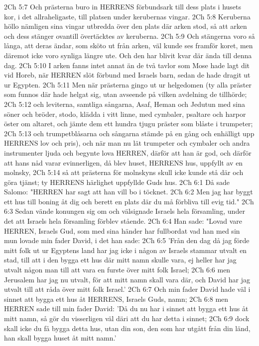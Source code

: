 2Ch 5:7  Och prästerna buro in HERRENS förbundsark till dess plats i husets kor, i det allraheligaste, till platsen under kerubernas vingar.
2Ch 5:8  Keruberna höllo nämligen sina vingar utbredda över den plats där arken stod, så att arken och dess stänger ovantill övertäcktes av keruberna.
2Ch 5:9  Och stängerna voro så långa, att deras ändar, som sköto ut från arken, väl kunde ses framför koret, men däremot icke voro synliga längre ute. Och den har blivit kvar där ända till denna dag.
2Ch 5:10  I arken fanns intet annat än de två tavlor som Mose hade lagt dit vid Horeb, när HERREN slöt förbund med Israels barn, sedan de hade dragit ut ur Egypten.
2Ch 5:11  Men när prästerna gingo ut ur helgedomen (ty alla präster som funnos där hade helgat sig, utan avseende på vilken avdelning de tillhörde;
2Ch 5:12  och leviterna, samtliga sångarna, Asaf, Heman och Jedutun med sina söner och bröder, stodo, klädda i vitt linne, med cymbaler, psaltare och harpor öster om altaret, och jämte dem ett hundra tjugu präster som blåste i trumpeter;
2Ch 5:13  och trumpetblåsarna och sångarna stämde på en gång och enhälligt upp HERRENS lov och pris), och när man nu lät trumpeter och cymbaler och andra instrumenter ljuda och begynte lova HERREN, därför att han är god, och därför att hans nåd varar evinnerligen, då blev huset, HERRENS hus, uppfyllt av en molnsky,
2Ch 5:14  så att prästerna för molnskyns skull icke kunde stå där och göra tjänst; ty HERRENS härlighet uppfyllde Guds hus.
2Ch 6:1  Då sade Salomo: "HERREN har sagt att han vill bo i töcknet.
2Ch 6:2  Men jag har byggt ett hus till boning åt dig och berett en plats där du må förbliva till evig tid."
2Ch 6:3  Sedan vände konungen sig om och välsignade Israels hela församling, under det att Israels hela församling förblev stående.
2Ch 6:4  Han sade: "Lovad vare HERREN, Israels Gud, som med sina händer har fullbordat vad han med sin mun lovade min fader David, i det han sade:
2Ch 6:5  'Från den dag då jag förde mitt folk ut ur Egyptens land har jag icke i någon av Israels stammar utvalt en stad, till att i den bygga ett hus där mitt namn skulle vara, ej heller har jag utvalt någon man till att vara en furste över mitt folk Israel;
2Ch 6:6  men Jerusalem har jag nu utvalt, för att mitt namn skall vara där, och David har jag utvalt till att råda över mitt folk Israel.'
2Ch 6:7  Och min fader David hade väl i sinnet att bygga ett hus åt HERRENS, Israels Guds, namn;
2Ch 6:8  men HERREN sade till min fader David: 'Då du nu har i sinnet att bygga ett hus åt mitt namn, så gör du visserligen väl däri att du har detta i sinnet;
2Ch 6:9  dock skall icke du få bygga detta hus, utan din son, den som har utgått från din länd, han skall bygga huset åt mitt namn.'
